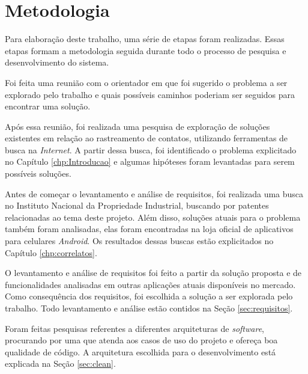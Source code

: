 \chapter{Metodologia}\label{chp:metodologia}

Para elaboração deste trabalho, uma série de etapas foram realizadas. Essas etapas formam a metodologia seguida durante todo o processo de pesquisa e desenvolvimento do sistema.

Foi feita uma reunião com o orientador em que foi sugerido o problema a ser explorado pelo trabalho e quais possíveis caminhos poderiam ser seguidos para encontrar uma solução.

Após essa reunião, foi realizada uma pesquisa de exploração de soluções existentes em relação ao rastreamento de contatos, utilizando ferramentas de busca na \textit{Internet}. A partir dessa busca, foi identificado o problema explicitado no Capítulo \ref{chp:Introducao} e algumas hipóteses foram levantadas para serem possíveis soluções.

Antes de começar o levantamento e análise de requisitos, foi realizada uma busca no Instituto Nacional da Propriedade Industrial, buscando por patentes relacionadas ao tema deste projeto. Além disso, soluções atuais para o problema também foram analisadas, elas foram encontradas na loja oficial de aplicativos para celulares \textit{Android}. Os resultados dessas buscas estão explicitados no Capítulo \ref{chp:correlatos}.

O levantamento e análise de requisitos foi feito a partir da solução proposta e de funcionalidades analisadas em outras aplicações atuais disponíveis no mercado. Como consequência dos requisitos, foi escolhida a solução a ser explorada pelo trabalho. Todo levantamento e análise estão contidos na Seção \ref{sec:requisitos}.

Foram feitas pesquisas referentes a diferentes arquiteturas de \textit{software}, procurando por uma que atenda aos casos de uso do projeto e ofereça boa qualidade de código. A arquitetura escolhida para o desenvolvimento está explicada na Seção \ref{sec:clean}.

